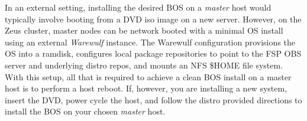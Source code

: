 In an external setting, installing the desired BOS on a {\em master} host would
typically involve booting from a DVD iso image on a new server.  However, on
the Zeus cluster, master nodes can be network booted with a minimal OS install
using an external {\em Warewulf} instance. The Warewulf configuration
provisions the OS into a ramdisk, configures local package repositories to
point to the FSP OBS server and underlying distro repos, and mounts an
NFS \$HOME file system. With this setup, all that is required to achieve a
clean BOS install on a master host is to perform a host reboot. If, however, you
are installing a new system, insert the \baseOS{} DVD, power cycle the host,
and follow the distro provided directions to install the BOS on your chosen
{\em master} host.  
